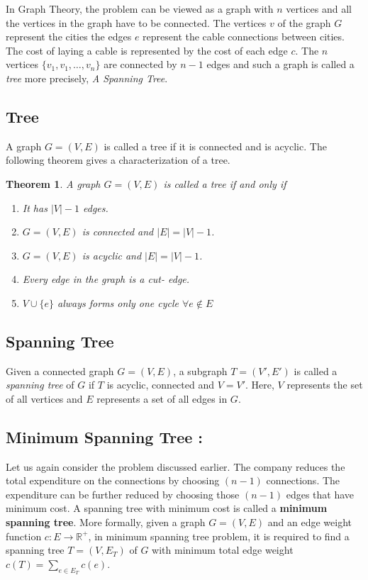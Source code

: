 \documentclass[12pt]{article}
\newtheorem{theorem}{Theorem}
\theoremstyle{plain}
\begin{document}
 In Graph Theory, the problem can be viewed as a graph with $n$ vertices and all the vertices 
in the graph have to be connected. The vertices $v$ of the graph $G$ represent the cities the edges $e$ represent the cable connections between cities. The 
cost of laying a cable is represented by the cost of each edge $c$. The $n$ vertices $\{v_1, 
v_1, \ldots,v_n\}$ are connected by $n-1$ edges and such a graph is called a \textit{tree} more 
precisely, \textit{A Spanning Tree}.

\subsection*{Tree}
A graph $G=(V,E)$ is called a tree if it is connected and is acyclic. The following theorem 
gives a characterization of a tree.

\begin{theorem}  \cite{harary6graph} \label{thm1}
A graph $G=(V, E)$ is called a tree if and only if
\begin{enumerate}
\item[(a)] It has $|V|-1$ edges. 
\item[(b)] $G=(V,E)$ is connected and $|E|=|V| -1$.
\item[(c)] $G=(V,E)$ is acyclic and $|E|=|V|-1$.
\item[(d)] Every edge in the graph is a cut- edge.
\item[(e)] $V \cup \{e\} $ always forms only one cycle $ \forall e \notin E$
\end{enumerate}
\end{theorem}


\subsection*{Spanning Tree}
Given a connected graph $G=(V, E)$, 
a subgraph $T=(V', E')$ is called a {\it spanning tree} of $G$ if $T$ is acyclic, connected and $V=V'$.
Here, $V$ represents the set of all vertices and $E$ represents a set of all edges in $G$.

\subsection*{Minimum Spanning Tree :}
 Let us again consider the problem discussed earlier. The company reduces the total expenditure on the 
connections by choosing $(n-1)$ connections. The expenditure can be further reduced by choosing those 
$(n-1)$ 
edges that have minimum cost. A spanning tree with minimum cost is called a \textbf{minimum spanning tree}. 
More formally, given a graph $G=(V, E)$ and an edge weight function $c:E \rightarrow \mathbb{R}^+$, in  minimum spanning tree problem, it is required to find a spanning tree $T=(V,E_T)$ of $G$ with minimum total edge weight $c(T)=\sum_{e \in E_T}c(e)$.
\end{document}
